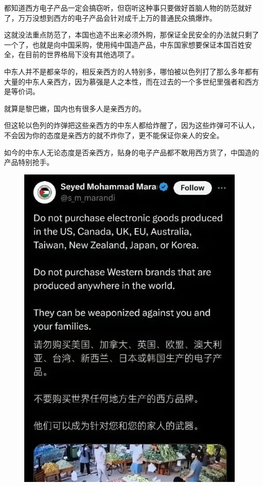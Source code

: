 \documentclass[UTF8,11pt,oneside]{ctexart}
\begin{document}


都知道西方电子产品一定会搞窃听，但窃听这种事只要做好首脑人物的防范就好了，万万没想到西方的电子产品会针对成千上万的普通民众搞爆炸。

这就没法重点防范了，本国也造不出来必须外购，那保证全民安全的办法就只剩了一个了，也就是向中国采购，使用纯中国造产品，中东国家想要保证本国百姓安全，在目前的世界格局下没有其他选项了。

中东人并不是都亲华的，相反亲西方的人特别多，哪怕被以色列打了那么多年都有大量的中东人亲西方，因为慕强是人之本性，而在过去的一个多世纪里强者和西方是等价词。

就算是黎巴嫩，国内也有很多人是亲西方的。

但这轮以色列的炸弹把这些亲西方的中东人都给炸醒了，因为这些炸弹可不认人，不会因为你的态度是亲西方的就不炸你了，更不能保证你亲人的安全。

如今的中东人无论态度是否亲西方，贴身的电子产品都不敢用西方货了，中国造的产品特别抢手。


\begin{figure}[H]
    \centering
    \includegraphics[width=11cm]{2024-09-21-005.jpg}
\end{figure}
\end{document}
